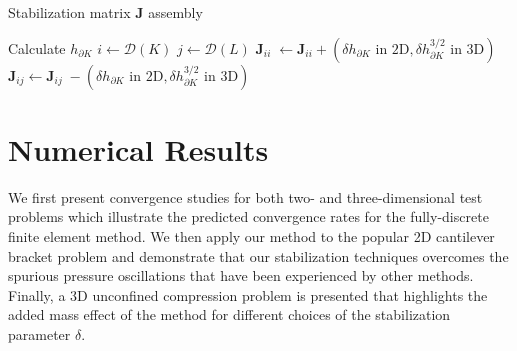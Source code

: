 \begin{algorithm}[H]
  \caption{Stabilization matrix $\boldsymbol{J}$ assembly}
  \label{algo:stabilization}
  \begin{algorithmic}
        \STATE Calculate $h_{\partial K}$
        \STATE $i \leftarrow \mathcal{D}(K)$
        \STATE $j \leftarrow \mathcal{D}(L)$
        \STATE $\boldsymbol{J}_{ii}\; \leftarrow \boldsymbol{J}_{ii} + (\delta h_{\partial K} \mbox{ in 2D},\delta h_{\partial K}^{3/2} \mbox{ in 3D}) $
        \STATE $\boldsymbol{J}_{ij}\leftarrow \boldsymbol{J}_{ij}\;-(\delta h_{\partial K} \mbox{ in 2D},\delta h_{\partial K}^{3/2} \mbox{ in 3D})  $
      \ENDFOR
    \ENDFOR
  \end{algorithmic}
\end{algorithm}

\section{Numerical Results}
\label{sec:results}
We first present convergence studies for both two- and three-dimensional test problems which illustrate the predicted convergence rates for the fully-discrete finite element method. We then apply our method to the popular 2D cantilever bracket problem and demonstrate that our stabilization techniques overcomes the spurious pressure oscillations that have been experienced by other methods. Finally, a 3D unconfined compression problem is presented that highlights the added mass effect of the method for different choices of the stabilization parameter $\delta$.

